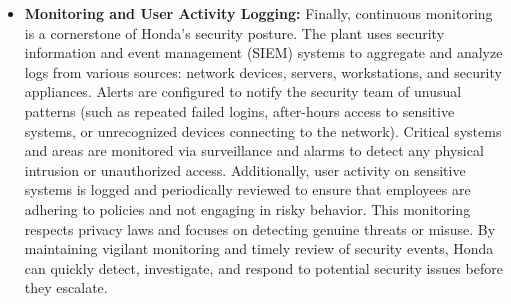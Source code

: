 \begin{itemize}
    \item \textbf{Monitoring and User Activity Logging:} Finally, continuous monitoring is a cornerstone of Honda’s security posture. The plant uses security information and event management (SIEM) systems to aggregate and analyze logs from various sources: network devices, servers, workstations, and security appliances. Alerts are configured to notify the security team of unusual patterns (such as repeated failed logins, after-hours access to sensitive systems, or unrecognized devices connecting to the network). Critical systems and areas are monitored via surveillance and alarms to detect any physical intrusion or unauthorized access. Additionally, user activity on sensitive systems is logged and periodically reviewed to ensure that employees are adhering to policies and not engaging in risky behavior. This monitoring respects privacy laws and focuses on detecting genuine threats or misuse. By maintaining vigilant monitoring and timely review of security events, Honda can quickly detect, investigate, and respond to potential security issues before they escalate.
\end{itemize}

